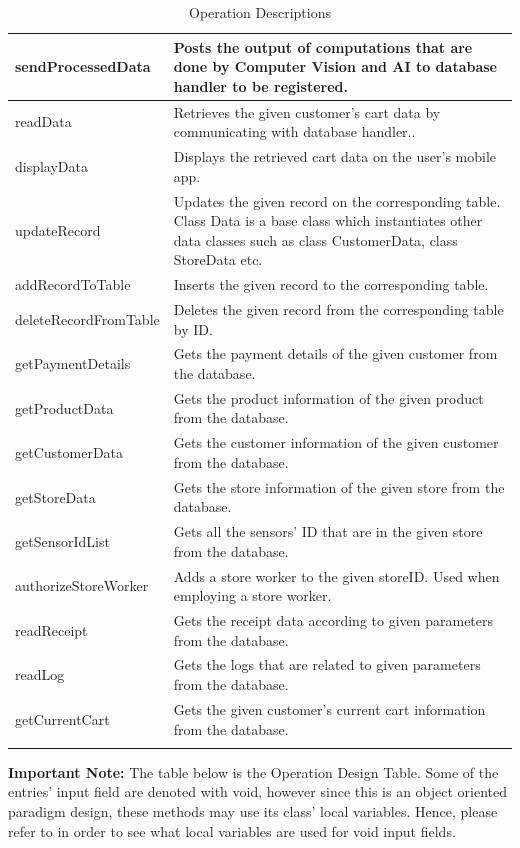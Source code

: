\documentclass[11pt]{article}
\begin{document}
\begin{longtable}[H]{|p{5cm}|p{11cm}|}
        sendProcessedData & Posts the output of computations that are done by Computer Vision and AI to database handler to be registered.\\ \hline
        readData & Retrieves the given customer's cart data by communicating with database handler..\\ \hline
        displayData & Displays the retrieved cart data on the user's mobile app. \\ \hline
        updateRecord & Updates the given record on the corresponding table. Class Data is a base class which instantiates other data classes 
        such as class CustomerData, class StoreData etc.\\ \hline
        addRecordToTable & Inserts the given record to the corresponding table.\\ \hline
        deleteRecordFromTable & Deletes the given record from the corresponding table by ID.\\ \hline
        getPaymentDetails & Gets the payment details of the given customer from the database.  \\ \hline
        getProductData & Gets the product information of the given product from the database. \\ \hline
        getCustomerData & Gets the customer information of the given customer from the database. \\ \hline      
        getStoreData & Gets the store information of the given store from the database. \\ \hline
        getSensorIdList & Gets all the sensors' ID that are in the given store from the database. \\ \hline
        authorizeStoreWorker & Adds a store worker to the given storeID. Used when employing a store worker. \\ \hline
        readReceipt & Gets the receipt data according to given parameters from the database. \\ \hline
        readLog & Gets the logs that are related to given parameters from the database. \\ \hline
        getCurrentCart & Gets the given customer's current cart information from the database. \\ \hline  
    \caption{Operation Descriptions}
    \label{oper_desc}
    \end{longtable}       
    
    \textbf{Important Note:} The table below is the Operation Design Table. Some of the entries' input field are denoted with void, however since this is an object oriented paradigm design, these methods may use its class' local variables. Hence, please refer to  in order to see what local variables are used for void input fields.\\
    
\end{document}
